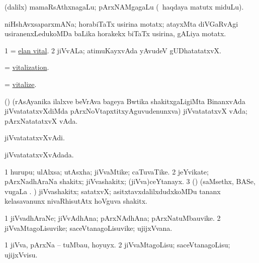 \bentry 
{} 
\gl{\nA}
\expl{}
\bmng
 (\bava dalilx) mamaRsAthxnagaLu; pArxNAMgagaLu (\kanmu\ haqdaya matutx miduLu). 
\emng
\eentry

\bentry
{}
\gl{\nA}
\expl{}
\bmng
 niHshAvxsaparxmANa; horabiTaTx usirina motatx; atayxMta diVGaRvAgi usiranenxLedukoMDa baLika horakekx biTaTx usirina, gALiya motatx. 
\emng
\eentry

\bentry 
{}
\gl{\nA}
\expl{}
\bmng
\bnum
\num{1} = \hyperref{kandict_e.pdf}{E}{elan vital}{elan vital}. 
\num{2} jiVvALa; atimuKayxvAda yAvudeV gUDhatatatxvX. 
\enum
\emng
\eentry

\bentry
{} 
\gl{\nA}
\expl{}
\bmng
 = \hyperlink{vitalization}{vitalization}. 
\emng
\eentry

\bentry
{} 
\gl{\sakirx}
\expl{}
\bmng
 = \hyperlink{vitalize}{vitalize}. 
\emng
\eentry

\bentry
{} 
\gl{\nA}
\expl{}
\bmng
 (\jiVvi) (rAsAyanika ilalxve beVrAva bageya Bwtika shakitxgaLigiMta BinanxvAda jiVvatatatxvXdiMda pArxNoVtapxtitxyAguvudenunxva) jiVvatatatxvX vAda; pArxNatatatxvX vAda. 
\emng
\eentry

\bentry 
{} 
\gl{\nA}
\expl{}
\bmng
jiVvatatatxvXvAdi. 
\emng
\eentry

\bentry 
{} 
\gl{\gu}
\expl{}
\bmng
jiVvatatatxvXvAdada. 
\emng
\eentry

\bentry
{} 
\gl{\nA}
\expl{}
\bmng
\bnum
\num{1} hurupu; ulAlxsa; utAsxha; jiVvaMtike; caTuvaTike. 
\num{2} jeYvikate; pArxNadhAraNa shakitx; jiVvashakitx; (jiVva)ceYtanayx. 
\num{3} (\rUpa) (saMsethx, BASe, \mo vugaLa \vi. ) jiVvashakitx; satatxvX; asitxtavxdalilxdudxkoMDu tananx kelasavanunx nivaRhisutAtx hoVguva shakitx. 
\enum
\emng
\eentry

\bentry
{} 
\gl{\nA}
\expl{}
\bmng
\bnum
\num{1} jiVvadhAraNe; jiVvAdhAna; pArxNAdhAna; pArxNatuMbauvike. 
\num{2} jiVvaMtagoLisuvike; saceVtanagoLisuvike; ujijxVvana. 
\enum
\emng
\eentry

\bentry 
{} 
\gl{\sakirx}
\expl{}
\bmng
\bnum
\num{1} jiVva, pArxNa -- tuMbau, hoyuyx. 
\num{2} jiVvaMtagoLisu; saceVtanagoLisu; ujijxVvisu. 
\enum
\emng
\eentry


